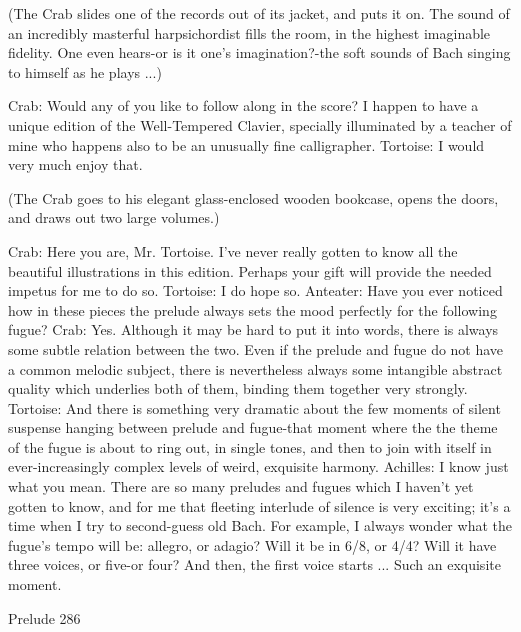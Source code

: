    (The Crab slides one of the records out of its jacket, and puts it on. The sound of
   an incredibly masterful harpsichordist fills the room, in the highest imaginable
   fidelity. One even hears-or is it one's imagination?-the soft sounds of Bach singing
   to himself as he plays ...)

Crab: Would any of you like to follow along in the score? I happen to have a unique
   edition of the Well-Tempered Clavier, specially illuminated by a teacher of mine who
   happens also to be an unusually fine calligrapher. Tortoise: I would very much enjoy
   that.

   (The Crab goes to his elegant glass-enclosed wooden bookcase, opens the doors, and
   draws out two large volumes.)

Crab: Here you are, Mr. Tortoise. I've never really gotten to know all the beautiful
   illustrations in this edition. Perhaps your gift will provide the needed impetus for me
   to do so.
Tortoise: I do hope so.
Anteater: Have you ever noticed how in these pieces the prelude always sets the mood
   perfectly for the following fugue?
Crab: Yes. Although it may be hard to put it into words, there is always some subtle
   relation between the two. Even if the prelude and fugue do not have a common
   melodic subject, there is nevertheless always some intangible abstract quality which
   underlies both of them, binding them together very strongly.
Tortoise: And there is something very dramatic about the few moments of silent suspense
   hanging between prelude and fugue-that moment where the the theme of the fugue is
   about to ring out, in single tones, and then to join with itself in ever-increasingly
   complex levels of weird, exquisite harmony.
Achilles: I know just what you mean. There are so many preludes and fugues which I
   haven't yet gotten to know, and for me that fleeting interlude of silence is very
   exciting; it's a time when I try to second-guess old Bach. For example, I always
   wonder what the fugue's tempo will be: allegro, or adagio? Will it be in 6/8, or 4/4?
   Will it have three voices, or five-or four? And then, the first voice starts ... Such an
   exquisite moment.




Prelude                                                                                 286

